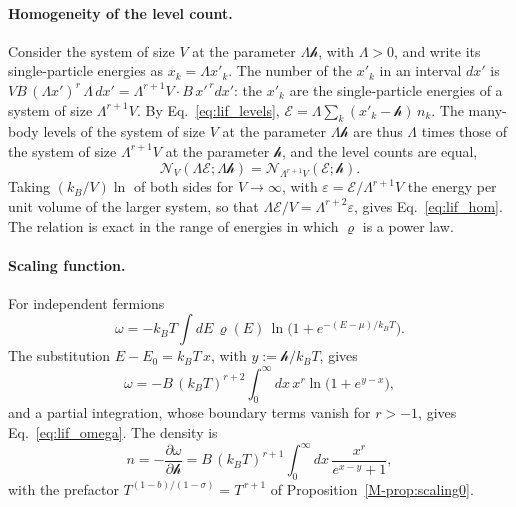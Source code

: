 \documentclass[10pt,a4paper]{article}
\theoremstyle{plain}
\theoremstyle{remark}
\newcommand{\cN}{\mathcal{N}}   %
\newcommand{\hfield}{\mathscr{h}}  %
\newcommand{\enrg}{\mathcal{E}}  %
\begin{document}
\paragraph{Homogeneity of the level count.} Consider the system of size $V$ at
the parameter $\Lambda\hfield$, with $\Lambda>0$, and write its
single-particle energies as $x_k=\Lambda x'_k$. The number of the $x'_k$ in
an interval $dx'$ is $VB\,(\Lambda x')^{r}\,\Lambda\,dx'
=\Lambda^{r+1}V\cdot B\,x'^{\,r}dx'$: the $x'_k$ are the single-particle
energies of a system of size $\Lambda^{r+1}V$. By
Eq.~\eqref{eq:lif_levels}, $\enrg=\Lambda\sum_k(x'_k-\hfield)\,n_k$. The
many-body levels of the system of size $V$ at the parameter $\Lambda\hfield$
are thus $\Lambda$ times those of the system of size $\Lambda^{r+1}V$ at the
parameter $\hfield$, and the level counts are equal,
\[
  \cN_V(\Lambda\enrg;\Lambda\hfield)
  =\cN_{\Lambda^{r+1}V}(\enrg;\hfield) .
\]
Taking $(k_B/V)\ln$ of both sides for $V\to\infty$, with
$\varepsilon=\enrg/\Lambda^{r+1}V$ the energy per unit volume of the larger
system, so that $\Lambda\enrg/V=\Lambda^{r+2}\varepsilon$, gives
Eq.~\eqref{eq:lif_hom}. The relation is exact in the range of energies in
which $\varrho$ is a power law.

\paragraph{Scaling function.} For independent
fermions~\cite[Ch.~4]{Schwabl}
\[
  \omega=-k_BT\int dE\,\varrho(E)\,\ln\big(1+e^{-(E-\mu)/k_BT}\big) .
\]
The substitution $E-E_0=k_BT\,x$, with $y:=\hfield/k_BT$, gives
\[
  \omega=-B\,(k_BT)^{r+2}\int_0^{\infty}dx\,x^{r}\ln\big(1+e^{y-x}\big) ,
\]
and a partial integration, whose boundary terms vanish for $r>-1$, gives
Eq.~\eqref{eq:lif_omega}. The density is
\[
  n=-\frac{\partial\omega}{\partial\hfield}
  =B\,(k_BT)^{r+1}\int_0^{\infty}dx\,\frac{x^{r}}{e^{x-y}+1} ,
\]
with the prefactor $T^{(1-b)/(1-\sigma)}=T^{\,r+1}$ of
Proposition~\ref{M-prop:scaling0}.
\end{document}
